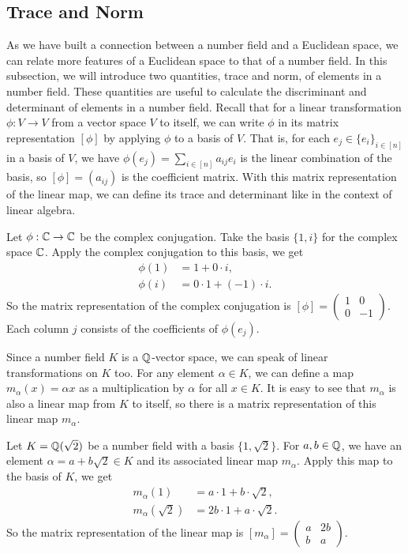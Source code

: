 \documentclass[../main.tex]{subfiles}
\begin{document}
	
\subsection{Trace and Norm}

As we have built a connection between a number field and a Euclidean space, we can relate more features of a Euclidean space to that of a number field. In this subsection, we will introduce two quantities, trace and norm, of elements in a number field. These quantities are useful to calculate the discriminant and determinant of elements in a number field. 
Recall that for a linear transformation $\phi:V \rightarrow V$ from a vector space $V$ to itself, we can write $\phi$ in its matrix representation $[\phi]$ by applying $\phi$ to a basis of $V$. That is, for each $e_j \in \{e_i\}_{i \in [n]}$ in a basis of $V$, we have $\phi(e_j) = \sum_{i \in [n]} a_{ij} e_i$ is the linear combination of the basis, so $[\phi] = (a_{ij})$ is the coefficient matrix. With this matrix representation of the linear map, we can 
define its trace and determinant like in the context of linear algebra. 

\begin{example}
Let $\phi: \mathbb{C} \rightarrow \mathbb{C}$ be the complex conjugation. Take the basis $\{1, i\}$ for the complex space $\mathbb{C}$. Apply the complex conjugation to this basis, we get 
\begin{align*}
    \phi(1) &= 1 + 0 \cdot i, \\
    \phi(i) &= 0\cdot 1 + (-1) \cdot i.
\end{align*}
So the matrix representation of the complex conjugation is 
$[\phi] = \begin{pmatrix}
  1 & 0\\ 
  0 & -1
\end{pmatrix}$. 
Each column $j$ consists of the coefficients of $\phi(e_j)$. 
\end{example}

Since a number field $K$ is a $\mathbb{Q}$-vector space, we can speak of linear transformations on $K$ too. For any element $\alpha \in K$, we can define a map 
$m_{\alpha}(x) = \alpha x$  as a multiplication by $\alpha$ for all $x \in K$. It is easy to see that $m_{\alpha}$ is also a linear map from $K$ to itself, so there is a matrix representation of this linear map $m_{\alpha}$. 

\begin{example}
Let $K = \mathbb{Q}(\sqrt{2})$ be a number field with a basis $\{1, \sqrt{2}\}$. For $a, b \in \mathbb{Q}$, we have an element $\alpha = a + b\sqrt{2} \in K$ and its associated linear map $m_{\alpha}$. Apply this map to the basis of $K$, we get 
\begin{align*}
    m_{\alpha}(1) &= a \cdot 1 + b \cdot \sqrt{2},  \\
    m_{\alpha}(\sqrt{2}) &= 2b\cdot 1 + a \cdot  \sqrt{2}.
\end{align*}
So the matrix representation of the linear map is 
$[m_{\alpha}] = \begin{pmatrix}
  a & 2b\\ 
  b & a
\end{pmatrix}$. 
\end{example}
\end{document}
